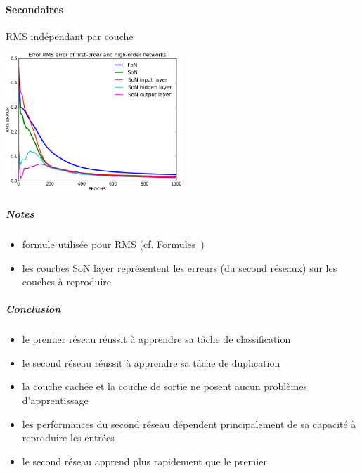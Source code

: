     \paragraph{Secondaires}
      RMS indépendant par couche
      \begin{center}
	\includegraphics[width=250px]{data/expA1/rms_new.png}
      \end{center}
      \subparagraph{Notes}
	\begin{itemize}
	  \item formule utilisée pour RMS (cf. Formules~)
	  \item les courbes SoN layer représentent les erreurs (du second réseaux) sur les couches à reproduire
	\end{itemize}
      \subparagraph{Conclusion}
	\begin{itemize}
	  \item le premier réseau réussit à apprendre sa tâche de classification
	  \item le second réseau réussit à apprendre sa tâche de duplication
	  \item la couche cachée et la couche de sortie ne posent aucun problèmes d'apprentissage
	  \item les performances du second réseau dépendent principalement de sa capacité à reproduire les entrées
	  \item le second réseau apprend plus rapidement que le premier
	\end{itemize}
